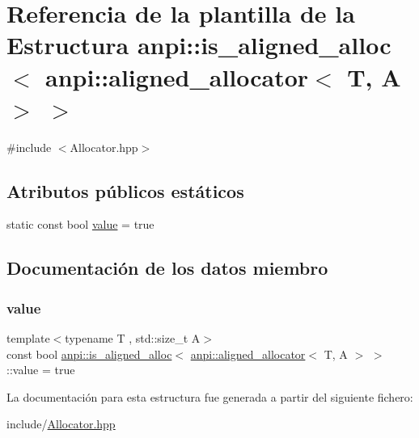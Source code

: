 \hypertarget{structanpi_1_1is__aligned__alloc_3_01anpi_1_1aligned__allocator_3_01T_00_01A_01_4_01_4}{}\section{Referencia de la plantilla de la Estructura anpi\+:\+:is\+\_\+aligned\+\_\+alloc$<$ anpi\+:\+:aligned\+\_\+allocator$<$ T, A $>$ $>$}
\label{structanpi_1_1is__aligned__alloc_3_01anpi_1_1aligned__allocator_3_01T_00_01A_01_4_01_4}


{\ttfamily \#include $<$Allocator.\+hpp$>$}

\subsection*{Atributos públicos estáticos}
\begin{DoxyCompactItemize}
\item 
static const bool \hyperlink{structanpi_1_1is__aligned__alloc_3_01anpi_1_1aligned__allocator_3_01T_00_01A_01_4_01_4_a5e7ef16ff5537d30d99e476ae01e362e}{value} = true
\end{DoxyCompactItemize}


\subsection{Documentación de los datos miembro}
\mbox{\label{structanpi_1_1is__aligned__alloc_3_01anpi_1_1aligned__allocator_3_01T_00_01A_01_4_01_4_a5e7ef16ff5537d30d99e476ae01e362e}} 
\subsubsection{\texorpdfstring{value}{value}}
{\footnotesize\ttfamily template$<$typename T , std\+::size\+\_\+t A$>$ \\
const bool \hyperlink{structanpi_1_1is__aligned__alloc}{anpi\+::is\+\_\+aligned\+\_\+alloc}$<$ \hyperlink{classanpi_1_1aligned__allocator}{anpi\+::aligned\+\_\+allocator}$<$ T, A $>$ $>$\+::value = true\hspace{0.3cm}{\ttfamily [static]}}



La documentación para esta estructura fue generada a partir del siguiente fichero\+:\begin{DoxyCompactItemize}
\item 
include/\hyperlink{Allocator_8hpp}{Allocator.\+hpp}\end{DoxyCompactItemize}
